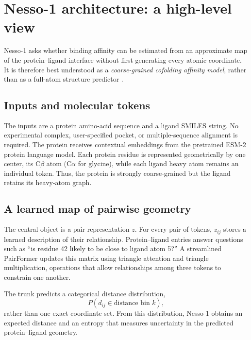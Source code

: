 \section{Nesso-1 architecture: a high-level view}

Nesso-1 asks whether binding affinity can be estimated from an approximate map
of the protein--ligand interface without first generating every atomic
coordinate. It is therefore best understood as a \emph{coarse-grained
cofolding affinity model}, rather than as a full-atom structure predictor
\citep{shenoy2026nesso1}.

\begin{center}
\end{center}

\subsection{Inputs and molecular tokens}

The inputs are a protein amino-acid sequence and a ligand SMILES string. No
experimental complex, user-specified pocket, or multiple-sequence alignment is
required. The protein receives contextual embeddings from the pretrained
ESM-2 protein language model. Each protein residue is represented
geometrically by one center, its C$\beta$ atom (C$\alpha$ for glycine), while
each ligand heavy atom remains an individual token. Thus, the protein is
strongly coarse-grained but the ligand retains its heavy-atom graph.

\subsection{A learned map of pairwise geometry}

The central object is a pair representation $z$. For every pair of tokens,
$z_{ij}$ stores a learned description of their relationship. Protein--ligand
entries answer questions such as ``is residue 42 likely to be close to ligand
atom 5?'' A streamlined PairFormer updates this matrix using triangle
attention and triangle multiplication, operations that allow relationships
among three tokens to constrain one another.

The trunk predicts a categorical distance distribution,
\[
  P(d_{ij}\in\text{distance bin }k),
\]
rather than one exact coordinate set. From this distribution, Nesso-1 obtains
an expected distance and an entropy that measures uncertainty in the predicted
protein--ligand geometry.

